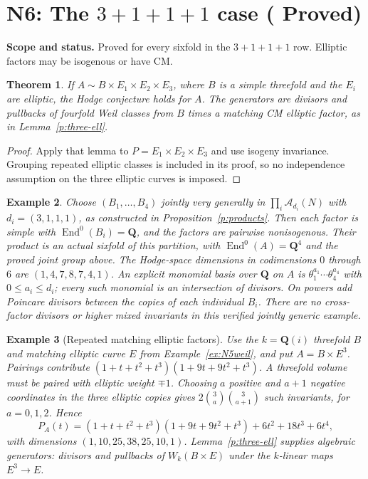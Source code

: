 \documentclass[11pt,reqno]{article}
\theoremstyle{emphasizedplain}
\DeclareRobustCommand{\provedstatus}{%
  \texorpdfstring{\textcolor{ProvedGreen}{\textbf{Proved}}}{Proved}}
\newtheorem{theorem}{Theorem}[section]
\theoremstyle{emphasizeddefinition}
\newtheorem{example}[theorem]{Example}
\theoremstyle{emphasizeddefinition}
\DeclareMathOperator{\End}{End}
\newcommand{\Q}{\mathbf Q}
\newcommand{\status}[1]{%
  \par\nobreak\smallskip\noindent
  {\setlength{\fboxsep}{7pt}%
   \colorbox{ScopeBackground}{%
    \parbox{\dimexpr\linewidth-2\fboxsep\relax}{%
     \small\textbf{\textcolor{HeadingInk}{Scope and status.}} #1}}}%
  \par\nobreak\medskip}
\begin{document}
\section{N6: The \texorpdfstring{$3+1+1+1$}{3+1+1+1} case (\provedstatus)}\label{sec:N6}

\status{Proved for every sixfold in the $3+1+1+1$ row. Elliptic
factors may be isogenous or have CM.}
\begin{theorem}
If $A\sim B\times E_1\times E_2\times E_3$, where $B$ is a simple
threefold and the $E_i$ are elliptic, the Hodge conjecture holds for $A$.
The generators are divisors and pullbacks of fourfold Weil classes from
$B$ times a matching CM elliptic factor, as in Lemma~\ref{p:three-ell}.
\end{theorem}
\begin{proof}
Apply that lemma to $P=E_1\times E_2\times E_3$ and use isogeny
invariance. Grouping repeated elliptic classes is included in its proof,
so no independence assumption on the three elliptic curves is imposed.
\end{proof}
\begin{example}
Choose $(B_1,\ldots,B_{4})$ jointly very generally in
$\prod_i\mathcal A_{d_i}(N)$ with $d_i=(3,1,1,1)$,
as constructed in Proposition~\ref{p:products}. Then each factor is
simple with $\End^0(B_i)=\Q$, and the factors are pairwise nonisogenous.
Their product is an actual sixfold of this partition, with
$\End^0(A)=\Q^{4}$ and the proved joint group above.
The Hodge-space dimensions in codimensions $0$ through $6$ are
$(1,4,7,8,7,4,1)$.
An explicit monomial basis over $\Q$ on $A$ is
$\theta_1^{a_1}\cdots\theta_{4}^{a_{4}}$ with
$0\leq a_i\leq d_i$; every such monomial is an intersection of divisors.
On powers add Poincare divisors between the copies of each individual
$B_i$. There are no cross-factor divisors or higher mixed invariants in
this verified jointly generic example.
\end{example}
\begin{example}[Repeated matching elliptic factors]
Use the $k=\Q(i)$ threefold $B$ and matching elliptic curve $E$
from Example~\ref{ex:N5weil}, and put $A=B\times E^3$. Pairings contribute
$(1+t+t^2+t^3)(1+9t+9t^2+t^3)$.
A threefold volume must be paired with elliptic weight $\mp1$.
Choosing $a$ positive and $a+1$ negative coordinates in the three
elliptic copies gives $2\binom3a\binom3{a+1}$ such invariants,
for $a=0,1,2$. Hence
\[
 P_A(t)=(1+t+t^2+t^3)(1+9t+9t^2+t^3)+6t^2+18t^3+6t^4,
\]
with dimensions $(1,10,25,38,25,10,1)$.
Lemma~\ref{p:three-ell} supplies algebraic generators: divisors and
pullbacks of $W_k(B\times E)$ under the $k$-linear maps $E^3\to E$.
\end{example}
\end{document}

